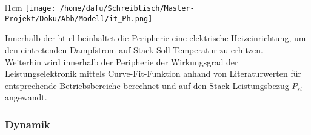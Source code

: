 \documentclass[onecolumn,10pt,titlepage]{article}
\begin{document}
\begin{wrapfigure}{l}{1cm}
	\texttt{[image: /home/dafu/Schreibtisch/Master-Projekt/Doku/Abb/Modell/it\_Ph.png]}
\end{wrapfigure}
Innerhalb der \gls{ht}-\gls{el} beinhaltet die Peripherie eine elektrische Heizeinrichtung, um den eintretenden Dampfstrom auf Stack-Soll-Temperatur zu erhitzen.
\vspace{2cm}
\\Weiterhin wird innerhalb der Peripherie der Wirkungsgrad der Leistungselektronik mittels Curve-Fit-Funktion anhand von Literaturwerten für entsprechende Betriebsbereiche berechnet und auf den Stack-Leistungsbezug $P_{st}$ angewandt.
%


\newpage
\subsubsection{Dynamik}
\label{subsubs_mod_Dyn}
\end{document}
